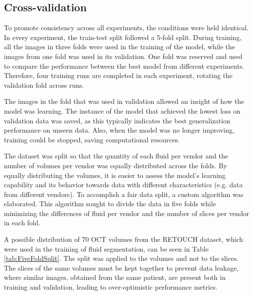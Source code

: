 \subsection{Cross-validation}\label{CrossValidation}
To promote consistency across all experiments, the conditions were held identical. In every experiment, the train-test split followed a 5-fold split. During training, all the images in three folds were used in the training of the model, while the images from one fold was used in its validation. One fold was reserved and used to compare the performance between the best model from different experiments. Therefore, four training runs are completed in each experiment, rotating the validation fold across runs.
\par
The images in the fold that was used in validation allowed an insight of how the model was learning. The instance of the model that achieved the lowest loss on validation data was saved, as this typically indicates the best generalization performance on unseen data. Also, when the model was no longer improving, training could be stopped, saving computational resources.
\par
The dataset was split so that the quantity of each fluid per vendor and the number of volumes per vendor was equally distributed across the folds. By equally distributing the volumes, it is easier to assess the model's learning capability and its behavior towards data with different characteristics (e.g. data from different vendors). To accomplish a fair data split, a custom algorithm was elaborated. This algorithm sought to divide the data in five folds while minimizing the differences of fluid per vendor and the number of slices per vendor in each fold.
\par
A possible distribution of 70 OCT volumes from the RETOUCH dataset, which were used in the training of fluid segmentation, can be seen in Table \ref{tab:FiveFoldSplit}. The split was applied to the volumes and not to the slices. The slices of the same volumes must be kept together to prevent data leakage, where similar images, obtained from the same patient, are present both in training and validation, leading to over-optimistic performance metrics.

